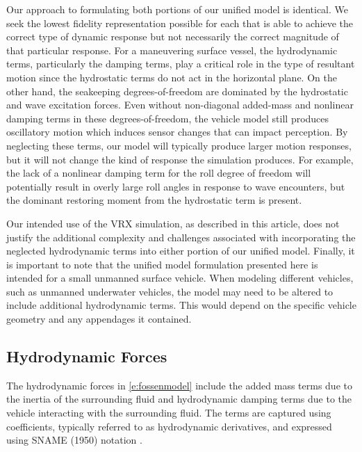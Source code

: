 \documentclass[utf8]{frontiersSCNS} %
\begin{document}
Our approach to formulating both portions of our unified model is identical. We seek the lowest fidelity representation possible for each that is able to achieve the correct type of dynamic response but not necessarily the correct magnitude of that particular response. For a maneuvering surface vessel, the hydrodynamic terms, particularly the damping terms, play a critical role in the type of resultant motion
since the hydrostatic terms do not act in the horizontal plane. On the other hand, the seakeeping degrees-of-freedom are dominated by the hydrostatic and wave excitation forces. Even without non-diagonal added-mass and nonlinear damping terms in these degrees-of-freedom, the vehicle model still produces oscillatory motion which induces sensor changes that can impact perception. By neglecting these terms, our model will typically produce larger motion responses, but it will not change the kind of response the simulation produces. For example, the lack of a nonlinear damping term for the roll degree of freedom will potentially result in overly large roll angles in response to wave encounters, but the dominant restoring moment from the hydrostatic term is present.

Our intended use of the VRX simulation, as described in this article, does not justify the additional complexity and challenges associated with incorporating the neglected hydrodynamic terms into either portion of our unified model. Finally, it is important to note that the unified model formulation presented here is intended for a small unmanned surface vehicle. When modeling different vehicles, such as unmanned underwater vehicles, the model may need to be altered to include additional hydrodynamic terms. This would depend on the specific vehicle geometry and any appendages it contained.



\subsection{Hydrodynamic Forces}\label{s:hydro}
%
The hydrodynamic forces in \eqref{e:fossenmodel} include the added mass terms due to the inertia of the surrounding fluid and hydrodynamic damping terms due to the vehicle interacting with the surrounding fluid. The terms are captured using coefficients, typically referred to as hydrodynamic derivatives, and expressed using SNAME (1950) notation \citep{fossen11handbook}.
\end{document}
